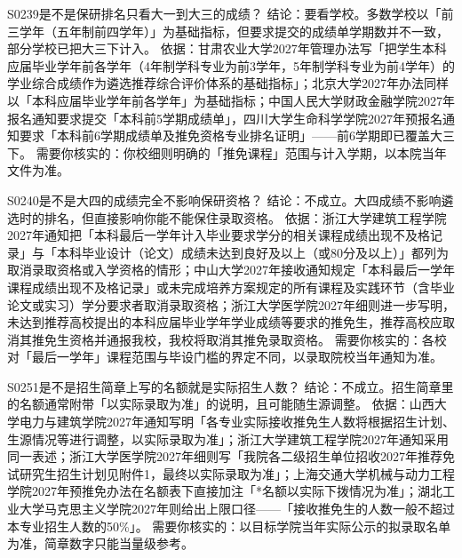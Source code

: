 \begin{qa}{S0239}{是不是保研排名只看大一到大三的成绩？}
结论：要看学校。多数学校以「前三学年（五年制前四学年）」为基础指标，但要求提交的成绩单学期数并不一致，部分学校已把大三下计入。
依据：甘肃农业大学2027年管理办法写「把学生本科应届毕业学年前各学年（4年制学科专业为前3学年，5年制学科专业为前4学年）的学业综合成绩作为遴选推荐综合评价体系的基础指标」；北京大学2027年办法同样以「本科应届毕业学年前各学年」为基础指标；中国人民大学财政金融学院2027年报名通知要求提交「本科前5学期成绩单」，四川大学生命科学学院2027年预报名通知要求「本科前6学期成绩单及推免资格专业排名证明」——前6学期即已覆盖大三下。
需要你核实的：你校细则明确的「推免课程」范围与计入学期，以本院当年文件为准。
\end{qa}

\begin{qa}{S0240}{是不是大四的成绩完全不影响保研资格？}
结论：不成立。大四成绩不影响遴选时的排名，但直接影响你能不能保住录取资格。
依据：浙江大学建筑工程学院2027年通知把「本科最后一学年计入毕业要求学分的相关课程成绩出现不及格记录」与「本科毕业设计（论文）成绩未达到良好及以上（或80分及以上）」都列为取消录取资格或入学资格的情形；中山大学2027年接收通知规定「本科最后一学年课程成绩出现不及格记录」或未完成培养方案规定的所有课程及实践环节（含毕业论文或实习）学分要求者取消录取资格；浙江大学医学院2027年细则进一步写明，未达到推荐高校提出的本科应届毕业学年学业成绩等要求的推免生，推荐高校应取消其推免生资格并通报我校，我校将取消其推免录取资格。
需要你核实的：各校对「最后一学年」课程范围与毕设门槛的界定不同，以录取院校当年通知为准。
\end{qa}

\begin{qa}{S0251}{是不是招生简章上写的名额就是实际招生人数？}
结论：不成立。招生简章里的名额通常附带「以实际录取为准」的说明，且可能随生源调整。
依据：山西大学电力与建筑学院2027年通知写明「各专业实际接收推免生人数将根据招生计划、生源情况等进行调整，以实际录取为准」；浙江大学建筑工程学院2027年通知采用同一表述；浙江大学医学院2027年细则写「我院各二级招生单位招收2027年推荐免试研究生招生计划见附件1，最终以实际录取为准」；上海交通大学机械与动力工程学院2027年预推免办法在名额表下直接加注「*名额以实际下拨情况为准」；湖北工业大学马克思主义学院2027年则给出上限口径——「接收推免生的人数一般不超过本专业招生人数的50\%」。
需要你核实的：以目标学院当年实际公示的拟录取名单为准，简章数字只能当量级参考。
\end{qa}

